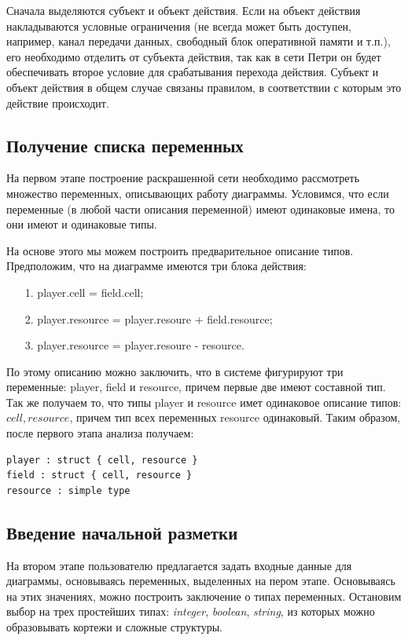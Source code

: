 Сначала выделяются субъект и объект действия. Если на объект действия накладываются условные ограничения (не всегда может быть доступен, например, канал передачи данных, свободный блок оперативной памяти и т.п.), его необходимо отделить от субъекта действия, так как в сети Петри он будет обеспечивать второе условие для срабатывания перехода действия. Субъект и объект действия в общем случае связаны правилом, в соответствии с которым это действие происходит. \cite{Korotkov} 

\subsection{Получение списка переменных}

На первом этапе построение раскрашенной сети необходимо рассмотреть множество переменных, описывающих работу диаграммы. Условимся, что если переменные (в любой части описания переменной) имеют одинаковые имена, то они имеют и одинаковые типы.

На основе этого мы можем построить предварительное описание типов. Предположим, что на диаграмме имеются три блока действия:
\begin{enumerate}
\item[1.] player.cell = field.cell;
\item[2.] player.resource = player.resoure + field.resource;
\item[3.] player.resource = player.resoure - resource.
\end{enumerate}

По этому описанию можно заключить, что в системе фигурируют три переменные: player, field и resource, причем первые две имеют составной тип. Так же получаем то, что типы player и resource имет одинаковое описание типов: $ { cell, resource } $, причем тип всех переменных resource одинаковый. Таким образом, после первого этапа анализа получаем:

\begin{lstlisting}[style=grammar,basicstyle=\small]
player : struct { cell, resource }
field : struct { cell, resource }
resource : simple type
\end{lstlisting}

\subsection{Введение начальной разметки}

На втором этапе пользователю предлагается задать входные данные для диаграммы, основываясь переменных, выделенных на пером этапе. Основываясь на этих значениях, можно построить заключение о типах переменных. Остановим выбор на трех простейших типах: \textit{integer}, \textit{boolean}, \textit{string}, из которых можно образовывать кортежи и сложные структуры.

